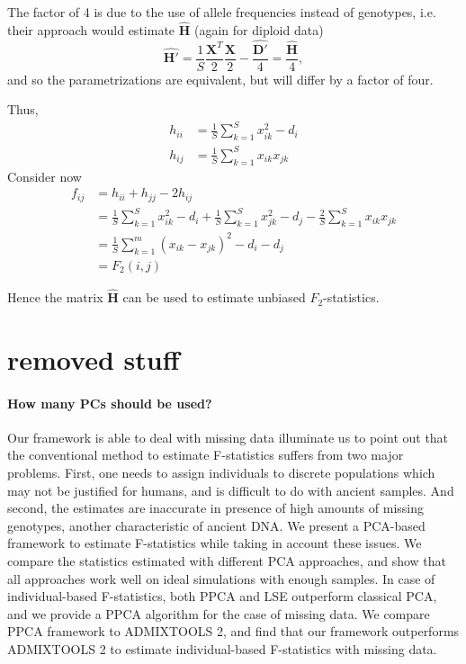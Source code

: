 \documentclass[12pt, letterpaper]{article}
\begin{document}
The factor of 4 is due to the use of allele frequencies instead of genotypes, i.e. their approach would estimate $\hat{\mathbf{H}}$ (again for diploid data)
\begin{equation*}
    \hat{\mathbf{H}'} = \frac{1}{S}\frac{\mathbf{X}^T}{2}\frac{\mathbf{X}}{2} - \frac{\hat{\mathbf{D'}}}{4} = \frac{\hat{\mathbf{H}}}{4},
\end{equation*}
and so the parametrizations are equivalent, but will differ by a factor of four.

Thus, 
\begin{subequations}\begin{align}
    h_{ii} &= \frac{1}{S}\sum_{k=1}^S x_{ik}^2 - d_i \\
    h_{ij} &= \frac{1}{S}\sum_{k=1}^S x_{ik}x_{jk} 
\end{align}\end{subequations}
Consider now
\begin{align}
    f_{ij} &= h_{ii} + h_{jj} - 2 h_{ij}\nonumber\\
     &= \frac{1}{S}\sum_{k=1}^S x_{ik}^2 - d_i + \frac{1}{S}\sum_{k=1}^S x_{jk}^2 - d_j - \frac{2}{S}\sum_{k=1}^S x_{ik}x_{jk}\nonumber \\
    &= \frac{1}{S} \sum_{k=1}^m (x_{ik} - x_{jk})^2 - d_i - d_j \\
    &= F_2(i,j)\nonumber
\end{align}

Hence the matrix $\hat{\mathbf{H}}$ can be used to estimate unbiased $F_2$-statistics.



\section{removed stuff}



\paragraph{How many PCs should be used?}
Our framework is able to deal with missing data illuminate us to point out that the conventional method to estimate F-statistics suffers from two major problems. First, one needs to assign individuals to discrete populations which may not be justified for humans, and is difficult to do with ancient samples. And second, the estimates are inaccurate in presence of high amounts of missing genotypes, another characteristic of ancient DNA. We present a PCA-based framework to estimate F-statistics while taking in account these issues. We compare the statistics estimated with different PCA approaches, and show that all approaches work well on ideal simulations with enough samples. In case of individual-based F-statistics, both PPCA and LSE outperform classical PCA, and we provide a PPCA algorithm for the case of missing data. We compare PPCA framework to ADMIXTOOLS 2, and find that our framework outperforms ADMIXTOOLS 2 to estimate individual-based F-statistics with missing data.
\end{document}
